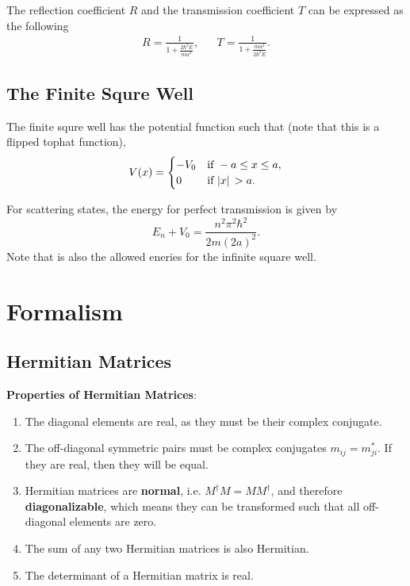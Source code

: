 \documentclass[a4paper]{article}
\begin{document}
\par The reflection coefficient $R$ and the transmission coefficient $T$ can be expressed as the following
\begin{align*}
    R = \frac{1}{1+\frac{2\hbar^2E}{m\alpha^2}}, &&  T = \frac{1}{1+\frac{m\alpha^2}{2\hbar^2E}}.
\end{align*}

\subsection{The Finite Squre Well}
\par The finite squre well has the potential function such that (note that this is a flipped tophat function),
\[
    V(x) = 
        \begin{cases}
            -V_{0} & \text{if } -a \leq x \leq a,\\
            0 & \text{if } \abs*{x} > a.
        \end{cases}    
\]
\par For scattering states, the energy for perfect transmission is given by 
\[
    E_{n}+V_{0} = \frac{n^2\pi^2\hbar^2}{2m(2a)^2}.
\]  
Note that is also the allowed eneries for the infinite square well.

\newpage
\section{Formalism}
\subsection{Hermitian Matrices}
\begin{flushleft}
    \textbf{Properties of Hermitian Matrices}:
\end{flushleft} 
\begin{enumerate}
    \item The diagonal elements are real, as they must be their complex conjugate.
    \item The off-diagonal symmetric pairs must be complex conjugates $m_{ij} = m_{ji}^{*}$. If they are real, then they will be equal.
    \item Hermitian matrices are \textbf{normal}, i.e. $M^{\dagger}M = MM^{\dagger}$, and therefore \textbf{diagonalizable}, which means they can be transformed such that all off-diagonal elements are zero.
    \item The sum of any two Hermitian matrices is also Hermitian.
    \item The determinant of a Hermitian matrix is real.
\end{enumerate}
\end{document}
